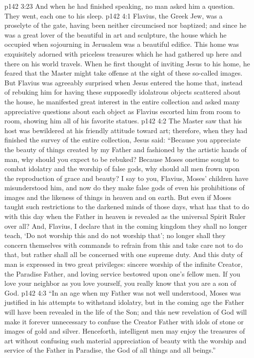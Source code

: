 \pc \vs p142 3:23 And when he had finished speaking, no man asked him a question. They went, each one to his sleep.
\vs p142 4:1 Flavius, the Greek Jew, was a proselyte of the gate, having been neither circumcised nor baptized; and since he was a great lover of the beautiful in art and sculpture, the house which he occupied when sojourning in Jerusalem was a beautiful edifice. This home was exquisitely adorned with priceless treasures which he had gathered up here and there on his world travels. When he first thought of inviting Jesus to his home, he feared that the Master might take offense at the sight of these so\hyp{}called images. But Flavius was agreeably surprised when Jesus entered the home that, instead of rebuking him for having these supposedly idolatrous objects scattered about the house, he manifested great interest in the entire collection and asked many appreciative questions about each object as Flavius escorted him from room to room, showing him all of his favorite statues.
\vs p142 4:2 The Master saw that his host was bewildered at his friendly attitude toward art; therefore, when they had finished the survey of the entire collection, Jesus said: \textcolor{ubdarkred}{“Because you appreciate the beauty of things created by my Father and fashioned by the artistic hands of man, why should you expect to be rebuked? Because Moses onetime sought to combat idolatry and the worship of false gods, why should all men frown upon the reproduction of grace and beauty? I say to you, Flavius, Moses’ children have misunderstood him, and now do they make false gods of even his prohibitions of images and the likeness of things in heaven and on earth. But even if Moses taught such restrictions to the darkened minds of those days, what has that to do with this day when the Father in heaven is revealed as the universal Spirit Ruler over all? And, Flavius, I declare that in the coming kingdom they shall no longer teach, ‘Do not worship this and do not worship that’; no longer shall they concern themselves with commands to refrain from this and take care not to do that, but rather shall all be concerned with one supreme duty. And this duty of man is expressed in two great privileges: sincere worship of the infinite Creator, the Paradise Father, and loving service bestowed upon one’s fellow men. If you love your neighbor as you love yourself, you really know that you are a son of God.}
\vs p142 4:3 \textcolor{ubdarkred}{“In an age when my Father was not well understood, Moses was justified in his attempts to withstand idolatry, but in the coming age the Father will have been revealed in the life of the Son; and this new revelation of God will make it forever unnecessary to confuse the Creator Father with idols of stone or images of gold and silver. Henceforth, intelligent men may enjoy the treasures of art without confusing such material appreciation of beauty with the worship and service of the Father in Paradise, the God of all things and all beings.”}

